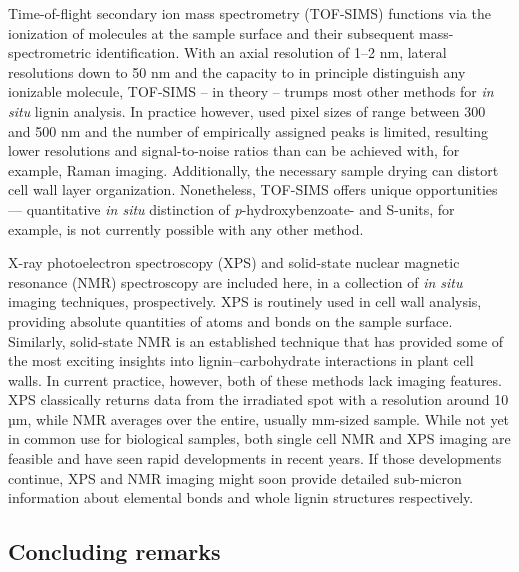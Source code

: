 \documentclass[journal=,manuscript=]{achemso}
\begin{document}
Time-of-flight secondary ion mass spectrometry (TOF-SIMS) functions via
the ionization of molecules at the sample surface and their subsequent
mass-spectrometric identification. With an axial resolution of 1--2 nm,
lateral resolutions down to 50 nm and the capacity to in principle
distinguish any ionizable molecule, TOF-SIMS -- in theory -- trumps most
other methods for \emph{in situ} lignin analysis. In practice however,
used pixel sizes of range between 300 and 500 nm and the number of
empirically assigned peaks is limited, resulting lower resolutions and
signal-to-noise ratios than can be achieved with, for example, Raman
imaging. Additionally, the necessary sample drying can distort cell wall
layer organization. Nonetheless, TOF-SIMS offers unique opportunities
--- quantitative \emph{in situ} distinction of \emph{p}-hydroxybenzoate-
and S-units, for example, is not currently possible with any other
method.\citep{Mottiar2023}

X-ray photoelectron spectroscopy (XPS) and solid-state nuclear magnetic
resonance (NMR) spectroscopy are included here, in a collection of
\emph{in situ} imaging techniques, prospectively. XPS is routinely used
in cell wall analysis, providing absolute quantities of atoms and bonds
on the sample surface.\citep{Watts2022} Similarly, solid-state NMR is an
established technique that has provided some of the most exciting
insights into lignin--carbohydrate interactions in plant cell
walls.\citep{Kirui2022} In current practice, however, both of these
methods lack imaging features. XPS classically returns data from the
irradiated spot with a resolution around 10 µm, while NMR averages over
the entire, usually mm-sized sample. While not yet in common use for
biological samples, both single cell NMR and XPS imaging are feasible
and have seen rapid developments in recent years. If those developments
continue, XPS and NMR imaging might soon provide detailed sub-micron
information about elemental bonds and whole lignin structures
respectively.

\subsection{Concluding remarks}\label{concluding-remarks}
\end{document}
